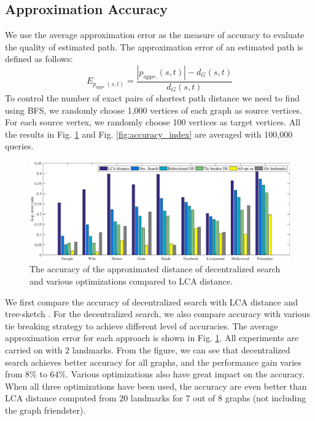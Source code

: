 \subsection{Approximation Accuracy}
\label{eval_accuracy}

We use the average approximation error as the measure of accuracy to evaluate the quality of estimated path. The approximation error of an estimated path is defined as follows:
\[
E_{p_{appr.}(s,t)} = \frac{|p_{appr.}(s,t)| - d_G(s,t)}{d_G(s,t)}
\]
To control the number of exact pairs of shortest path distance we need to find using BFS, we randomly choose 1,000 vertices of each graph as source vertices. For each source vertex, we randomly choose 100 vertices as target vertices. All the results in Fig. \ref{fig:accuracy_dec} and Fig. \ref{fig:accuracy_index} are averaged with 100,000 queries.

\begin{figure}[t]
    \centering
    \includegraphics[width=\linewidth]{./figures/accuracy_dec.pdf}
    \caption{The accuracy of the approximated distance of decentralized search and various optimizations compared to LCA distance.}
    \label{fig:accuracy_dec}
\end{figure}

We first compare the accuracy of decentralized search with LCA distance and tree-sketch \cite{Gubichev:2010:FAE:1871437.1871503}. For the decentralized search, we also compare accuracy with various tie breaking strategy to achieve different level of accuracies. The average approximation error for each approach is shown in Fig. \ref{fig:accuracy_dec}. All experiments are carried on with $2$ landmarks. From the figure, we can see that decentralized search achieves better accuracy for all graphs, and the performance gain varies from $8\%$ to $64\%$. Various optimizations also have great impact on the accuracy. When all three optimizations have been used, the accuracy are even better than LCA distance computed from $20$ landmarks for $7$ out of $8$ graphs (not including the graph friendster).

